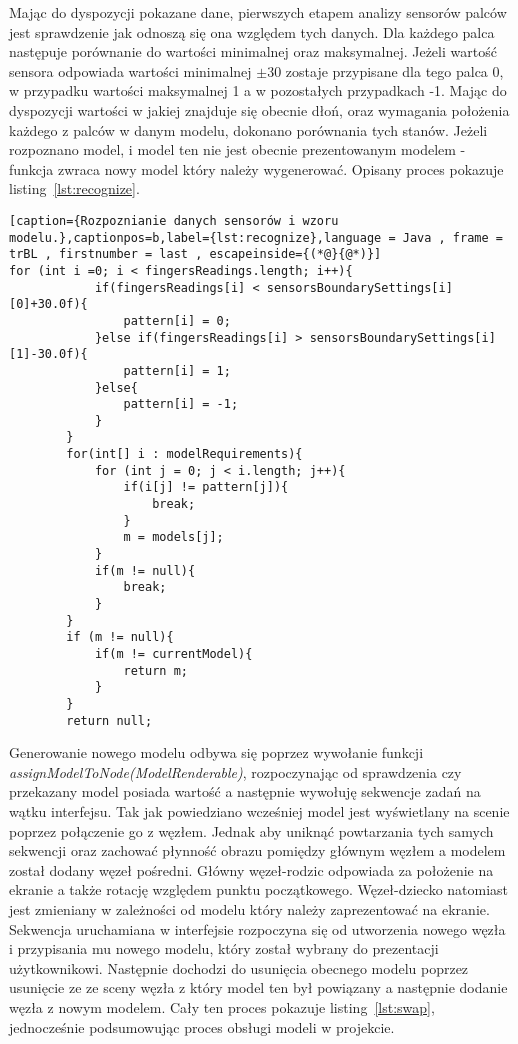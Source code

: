 Mając do dyspozycji pokazane dane, pierwszych etapem analizy sensorów palców jest sprawdzenie jak odnoszą się ona względem tych danych. Dla każdego palca następuje porównanie do wartości minimalnej oraz maksymalnej. Jeżeli wartość sensora odpowiada wartości minimalnej $\pm 30$ zostaje przypisane dla tego palca 0, w przypadku wartości maksymalnej 1 a w pozostałych przypadkach -1. Mając do dyspozycji wartości w jakiej znajduje się obecnie dłoń, oraz wymagania położenia każdego z palców w danym modelu, dokonano porównania tych stanów. Jeżeli rozpoznano model, i model ten nie jest obecnie prezentowanym modelem - funkcja zwraca nowy model który należy wygenerować. Opisany proces pokazuje listing~\ref{lst:recognize}.
\begin{lstlisting}[caption={Rozpoznianie danych sensorów i wzoru modelu.},captionpos=b,label={lst:recognize},language = Java , frame = trBL , firstnumber = last , escapeinside={(*@}{@*)}]     
for (int i =0; i < fingersReadings.length; i++){
            if(fingersReadings[i] < sensorsBoundarySettings[i][0]+30.0f){
                pattern[i] = 0;
            }else if(fingersReadings[i] > sensorsBoundarySettings[i][1]-30.0f){
                pattern[i] = 1;
            }else{
                pattern[i] = -1;
            }
        }   
        for(int[] i : modelRequirements){
            for (int j = 0; j < i.length; j++){
                if(i[j] != pattern[j]){
                    break;
                }
                m = models[j];
            }
            if(m != null){
                break;
            }
        }
        if (m != null){
            if(m != currentModel){
                return m;
            }
        }
        return null;                                                        
\end{lstlisting}	
Generowanie nowego modelu odbywa się poprzez wywołanie funkcji \textit{assignModelToNode(ModelRenderable)}, rozpoczynając od sprawdzenia czy przekazany model posiada wartość a następnie wywołuję sekwencje zadań na wątku interfejsu. Tak jak powiedziano wcześniej model jest wyświetlany na scenie poprzez połączenie go z węzłem. Jednak aby uniknąć powtarzania tych samych sekwencji oraz zachować płynność obrazu pomiędzy głównym węzłem a modelem został dodany węzeł pośredni. Główny węzeł-rodzic odpowiada za położenie na ekranie a także rotację względem punktu początkowego. Węzeł-dziecko natomiast jest zmieniany w zależności od modelu który należy zaprezentować na ekranie. Sekwencja uruchamiana w interfejsie rozpoczyna się od utworzenia nowego węzła i przypisania mu nowego modelu, który został wybrany do prezentacji użytkownikowi. Następnie dochodzi do usunięcia obecnego modelu poprzez usunięcie ze ze sceny węzła z który model ten był powiązany a następnie dodanie węzła z nowym modelem. Cały ten proces pokazuje listing~\ref{lst:swap}, jednocześnie podsumowując proces obsługi modeli w projekcie. \newpage

